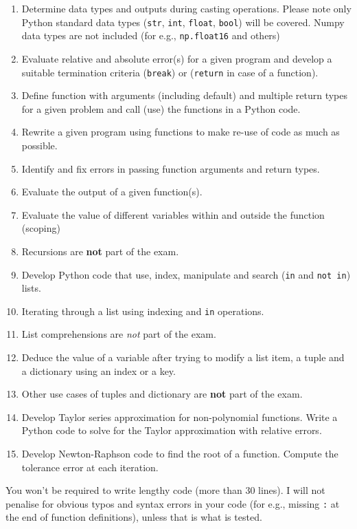 \documentclass[]{article}
\begin{document}
\begin{enumerate}
	\item Determine data types and outputs during casting operations. Please note only Python standard data types (\verb|str|, \verb|int|, \verb|float|, \verb|bool|) will be covered. Numpy data types are not included (for e.g., \verb|np.float16| and others)
	\item Evaluate relative and absolute error(s) for a given program and develop  a suitable termination criteria (\verb|break|) or (\verb|return| in case of a function).
	\item Define function with arguments (including default) and multiple return types for a given problem and call (use) the functions in a Python code.
	\item Rewrite a given program using functions to make re-use of code as much as possible.
\item Identify and fix errors in passing function arguments and return types.
	\item Evaluate the output of a given function(s).
	\item Evaluate the value of different variables within and outside the function (scoping)
	\item Recursions are \textbf{not} part of the exam.
	\item Develop Python code that use, index, manipulate and search (\verb|in| and \verb|not in|) lists.
	\item Iterating through a list using indexing and \verb|in| operations.
	\item List comprehensions are \textit{not} part of the exam.
	\item Deduce the value of a variable after trying to modify a list item, a tuple and a dictionary using an index or a key.
	\item Other use cases of tuples and dictionary are \textbf{not} part of the exam.
	\item Develop Taylor series approximation for non-polynomial functions. Write a Python code to solve for the Taylor approximation with relative errors.
	\item Develop Newton-Raphson code to find the root of a function. Compute the tolerance error at each iteration.


\end{enumerate}

You won't be required to write lengthy code (more than 30 lines). I will not penalise for obvious typos and syntax errors in your code (for e.g., missing \verb|:| at the end of function definitions), unless that is what is tested.
\end{document}
